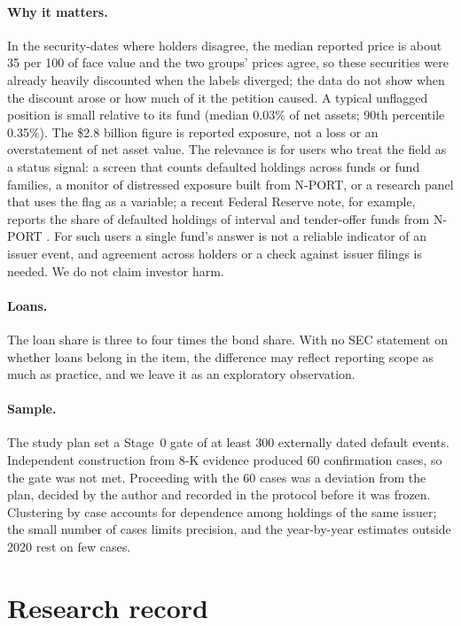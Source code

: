 \documentclass[11pt]{article}
\begin{document}
\paragraph{Why it matters.} In the security-dates where holders disagree, the median reported price is
about 35 per 100 of face value and the two groups' prices agree, so these securities were already
heavily discounted when the labels diverged; the data do not show when the discount arose or how much
of it the petition caused. A typical unflagged position is small
relative to its fund (median 0.03\% of net assets; 90th percentile 0.35\%). The \$2.8 billion figure is
reported exposure, not a loss or an overstatement of net asset value. The relevance is for users who
treat the field as a status signal: a screen that counts defaulted holdings across funds or fund
families, a monitor of distressed exposure built from N-PORT, or a research panel that uses the flag
as a variable; a recent Federal Reserve note, for example, reports the share of defaulted holdings of
interval and tender-offer funds from N-PORT \citep{george2026}. For such users a single fund's answer is not a reliable indicator of an issuer event,
and agreement across holders or a check against issuer filings is needed. We do not claim investor
harm.

\paragraph{Loans.} The loan share is three to four times the bond share. With no SEC statement on
whether loans belong in the item, the difference may reflect reporting scope as much as practice, and
we leave it as an exploratory observation.

\paragraph{Sample.} The study plan set a Stage~0 gate of at least 300 externally dated default events.
Independent construction from 8-K evidence produced 60 confirmation cases, so the gate was not met.
Proceeding with the 60 cases was a deviation from the plan, decided by the author and recorded in the
protocol before it was frozen. Clustering by case accounts for dependence among holdings of the same
issuer; the small number of cases limits precision, and the year-by-year estimates outside 2020 rest on
few cases.

\section{Research record}\label{sec:record}
\end{document}
